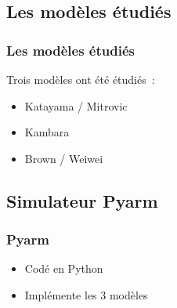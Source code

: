 \documentclass{beamer}
\begin{document}
\subsection{Les modèles étudiés}

\begin{frame}
\frametitle{Les modèles étudiés}
Trois modèles ont été étudiés~:
\begin{itemize}
    \item Katayama / Mitrovic
    \item Kambara
    \item Brown / Weiwei
\end{itemize}
\end{frame}

\subsection{Simulateur Pyarm}

\begin{frame}
\frametitle{Pyarm}
\begin{itemize}
    \item Codé en Python
    \item Implémente les 3 modèles
\end{itemize}
\begin{figure}
    \centering
    ~~~
    ~~~
\end{figure}
\end{frame}
\end{document}
